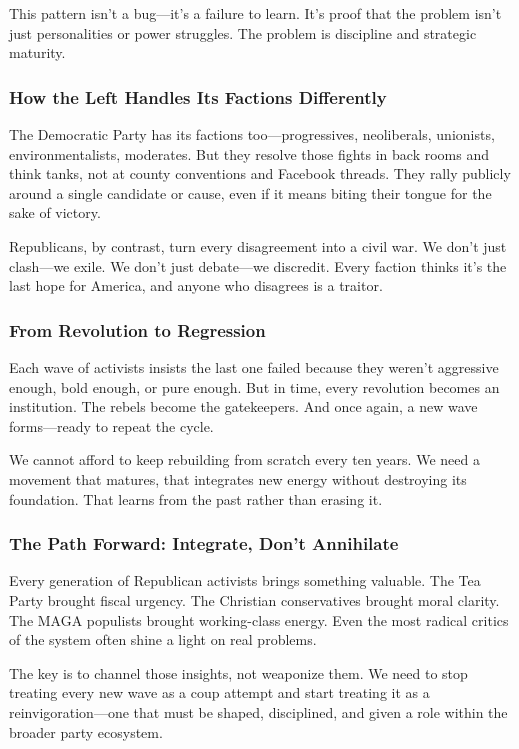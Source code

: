 This pattern isn’t a bug—it’s a failure to learn. It’s proof that the problem isn’t just personalities or power struggles. The problem is discipline and strategic maturity.

\subsubsection{How the Left Handles Its Factions Differently}
The Democratic Party has its factions too—progressives, neoliberals, unionists, environmentalists, moderates. But they resolve those fights in back rooms and think tanks, not at county conventions and Facebook threads. They rally publicly around a single candidate or cause, even if it means biting their tongue for the sake of victory.

Republicans, by contrast, turn every disagreement into a civil war. We don’t just clash—we exile. We don’t just debate—we discredit. Every faction thinks it’s the last hope for America, and anyone who disagrees is a traitor.

\subsubsection{From Revolution to Regression}
Each wave of activists insists the last one failed because they weren’t aggressive enough, bold enough, or pure enough. But in time, every revolution becomes an institution. The rebels become the gatekeepers. And once again, a new wave forms—ready to repeat the cycle.

We cannot afford to keep rebuilding from scratch every ten years. We need a movement that matures, that integrates new energy without destroying its foundation. That learns from the past rather than erasing it.

\subsubsection{The Path Forward: Integrate, Don’t Annihilate}
Every generation of Republican activists brings something valuable. The Tea Party brought fiscal urgency. The Christian conservatives brought moral clarity. The MAGA populists brought working-class energy. Even the most radical critics of the system often shine a light on real problems.

The key is to channel those insights, not weaponize them. We need to stop treating every new wave as a coup attempt and start treating it as a reinvigoration—one that must be shaped, disciplined, and given a role within the broader party ecosystem.

